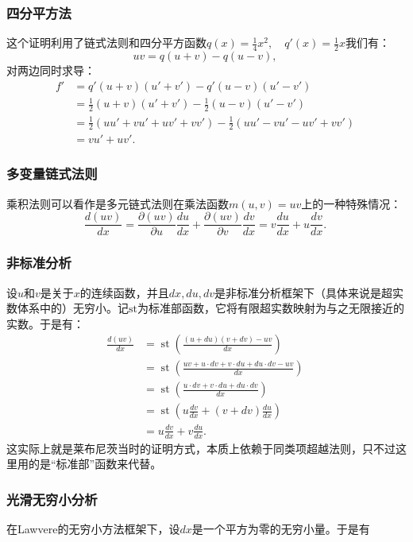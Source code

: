 \subsubsection{四分平方法}
这个证明利用了链式法则和四分平方函数$q(x) = \tfrac{1}{4}x^{2}, \quad q'(x) = \tfrac{1}{2}x$我们有：
$$
uv = q(u+v) - q(u-v),~
$$
对两边同时求导：
$$
\begin{aligned}
f' &= q'(u+v)(u' + v') - q'(u-v)(u' - v') \\[6pt]
&= \tfrac{1}{2}(u+v)(u' + v') - \tfrac{1}{2}(u-v)(u' - v') \\[6pt]
&= \tfrac{1}{2}(uu' + vu' + uv' + vv') - \tfrac{1}{2}(uu' - vu' - uv' + vv') \\[6pt]
&= vu' + uv'.
\end{aligned}~
$$
\subsubsection{多变量链式法则}
乘积法则可以看作是多元链式法则在乘法函数$m(u, v) = uv$上的一种特殊情况：
$$
\frac{d(uv)}{dx} = \frac{\partial (uv)}{\partial u}\frac{du}{dx} + \frac{\partial (uv)}{\partial v}\frac{dv}{dx} = v\frac{du}{dx} + u\frac{dv}{dx}.~
$$
\subsubsection{非标准分析}
设$u$和$v$是关于$x$的连续函数，并且$dx, du, dv$是非标准分析框架下（具体来说是超实数体系中的）无穷小。记$\mathrm{st}$为标准部函数，它将有限超实数映射为与之无限接近的实数。于是有：
$$
\begin{aligned}
\frac{d(uv)}{dx}
&= \operatorname{st}\!\left(\frac{(u+du)(v+dv)-uv}{dx}\right)\\
&= \operatorname{st}\!\left(\frac{uv+u\cdot dv+v\cdot du+du\cdot dv - uv}{dx}\right)\\
&= \operatorname{st}\!\left(\frac{u\cdot dv+v\cdot du+du\cdot dv}{dx}\right)\\
&= \operatorname{st}\!\left(u\frac{dv}{dx}+(v+dv)\frac{du}{dx}\right)\\
&= u\frac{dv}{dx}+v\frac{du}{dx}.
\end{aligned}~
$$
这实际上就是莱布尼茨当时的证明方式，本质上依赖于同类项超越法则，只不过这里用的是“标准部”函数来代替。
\subsubsection{光滑无穷小分析}
在Lawvere的无穷小方法框架下，设$dx$是一个平方为零的无穷小量。于是有

